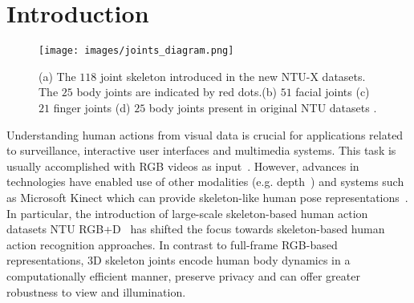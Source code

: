 \documentclass[sigconf,screen,prologue,table,dvipsnames]{acmart}
\begin{document}




\maketitle

\section{Introduction}
\label{sec:intro}

\begin{figure}[]
    \centering
    \texttt{[image: images/joints\_diagram.png]}
    \caption{(a) The $118$ joint skeleton introduced in the new NTU-X datasets. The $25$ body joints are indicated by red dots.(b) $51$ facial joints (c) $21$ finger joints (d) $25$ body joints present in original NTU datasets .  }
    \label{fig:joints_fig}
\end{figure}

Understanding human actions from visual data is crucial for applications related to surveillance, interactive user interfaces and multimedia systems. This task is usually accomplished with RGB videos as input~\cite{Poppe_IV_2010}. However, advances in technologies have enabled use of other modalities (e.g. depth~\cite{wang2012mining}) and systems such as Microsoft Kinect which can provide skeleton-like human pose representations~\cite{ren2020survey}. In particular, the introduction of large-scale skeleton-based human action datasets NTU RGB+D~\cite{Shahroudy_2016_CVPR,Liu_2019_NTURGBD120} has shifted the focus towards skeleton-based human action recognition approaches. In contrast to full-frame RGB-based representations, 3D skeleton joints encode human body dynamics in a computationally efficient manner, preserve privacy and can offer greater robustness to view and illumination.
\end{document}
